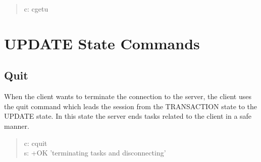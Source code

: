 \documentclass[a4paper,11pt]{article}
\begin{document}
\noindent
\begin{quote}
  c: cgetu
\end{quote}
\clearpage
\section{UPDATE State Commands}
\subsection{Quit}
When the client wants to terminate the connection to the server, the client uses the quit command which leads the session from the TRANSACTION state to the UPDATE state. In this state the server ends tasks related to the client in a safe manner.

\begin{quote}
  c: cquit\\
  s: +OK 'terminating tasks and disconnecting'
\end{quote}
\end{document}
